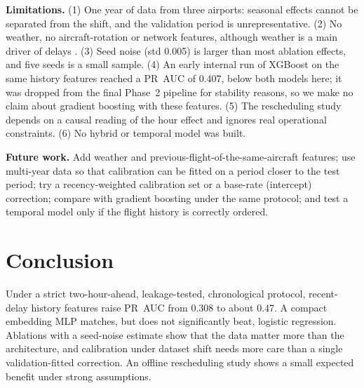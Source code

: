 \documentclass[conference]{IEEEtran}
\begin{document}
\textbf{Limitations.} (1) One year of data from three airports: seasonal effects cannot be separated from the shift, and the validation period is unrepresentative. (2) No weather, no aircraft-rotation or network features, although weather is a main driver of delays \cite{choi}. (3) Seed noise (std 0.005) is larger than most ablation effects, and five seeds is a small sample. (4) An early internal run of XGBoost on the same history features reached a PR~AUC of 0.407, below both models here; it was dropped from the final Phase~2 pipeline for stability reasons, so we make no claim about gradient boosting with these features. (5) The rescheduling study depends on a causal reading of the hour effect and ignores real operational constraints. (6) No hybrid or temporal model was built.

\textbf{Future work.} Add weather and previous-flight-of-the-same-aircraft features; use multi-year data so that calibration can be fitted on a period closer to the test period; try a recency-weighted calibration set or a base-rate (intercept) correction; compare with gradient boosting under the same protocol; and test a temporal model only if the flight history is correctly ordered.

\section{Conclusion}
Under a strict two-hour-ahead, leakage-tested, chronological protocol, recent-delay history features raise PR~AUC from 0.308 to about 0.47. A compact embedding MLP matches, but does not significantly beat, logistic regression. Ablations with a seed-noise estimate show that the data matter more than the architecture, and calibration under dataset shift needs more care than a single validation-fitted correction. An offline rescheduling study shows a small expected benefit under strong assumptions.
\end{document}
